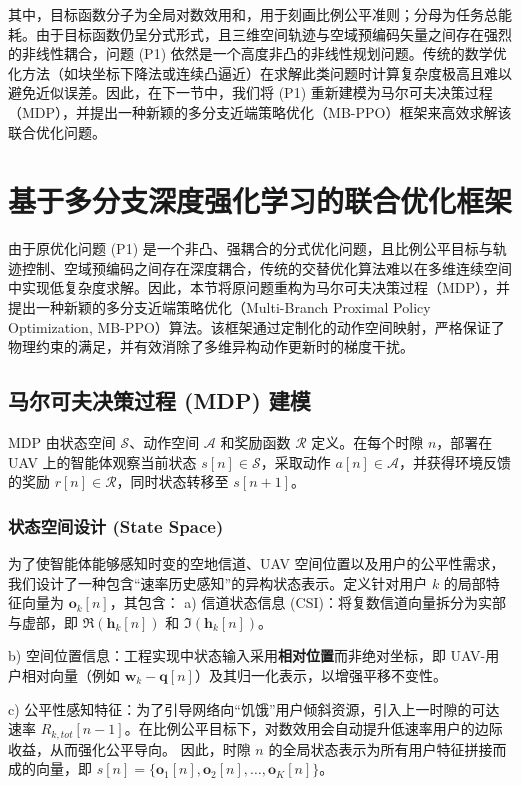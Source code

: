 \documentclass[journal,onecolumn]{IEEEtran}
\begin{document}
	其中，目标函数分子为全局对数效用和，用于刻画比例公平准则；分母为任务总能耗。由于目标函数仍呈分式形式，且三维空间轨迹与空域预编码矢量之间存在强烈的非线性耦合，问题 (P1) 依然是一个高度非凸的非线性规划问题。传统的数学优化方法（如块坐标下降法或连续凸逼近）在求解此类问题时计算复杂度极高且难以避免近似误差。因此，在下一节中，我们将 (P1) 重新建模为马尔可夫决策过程（MDP），并提出一种新颖的多分支近端策略优化（MB-PPO）框架来高效求解该联合优化问题。
	
	
	
	\section{基于多分支深度强化学习的联合优化框架}
	\label{sec:algorithm}
	
	由于原优化问题 (P1) 是一个非凸、强耦合的分式优化问题，且比例公平目标与轨迹控制、空域预编码之间存在深度耦合，传统的交替优化算法难以在多维连续空间中实现低复杂度求解。因此，本节将原问题重构为马尔可夫决策过程（MDP），并提出一种新颖的多分支近端策略优化（Multi-Branch Proximal Policy Optimization, MB-PPO）算法。该框架通过定制化的动作空间映射，严格保证了物理约束的满足，并有效消除了多维异构动作更新时的梯度干扰。
	
	\subsection{马尔可夫决策过程 (MDP) 建模}
	MDP 由状态空间 $\mathcal{S}$、动作空间 $\mathcal{A}$ 和奖励函数 $\mathcal{R}$ 定义。在每个时隙 $n$，部署在 UAV 上的智能体观察当前状态 $s[n] \in \mathcal{S}$，采取动作 $a[n] \in \mathcal{A}$，并获得环境反馈的奖励 $r[n] \in \mathcal{R}$，同时状态转移至 $s[n+1]$。
	
	\subsubsection{状态空间设计 (State Space)}
	为了使智能体能够感知时变的空地信道、UAV 空间位置以及用户的公平性需求，我们设计了一种包含“速率历史感知”的异构状态表示。定义针对用户 $k$ 的局部特征向量为 $\mathbf{o}_k[n]$，其包含：
	a) 信道状态信息 (CSI)：将复数信道向量拆分为实部与虚部，即 $\Re(\mathbf{h}_k[n])$ 和 $\Im(\mathbf{h}_k[n])$。
	
	b) 空间位置信息：工程实现中状态输入采用\textbf{相对位置}而非绝对坐标，即 UAV-用户相对向量（例如 $\mathbf{w}_k-\mathbf{q}[n]$）及其归一化表示，以增强平移不变性。
	
	c) 公平性感知特征：为了引导网络向“饥饿”用户倾斜资源，引入上一时隙的可达速率 $R_{k,tot}[n-1]$。在比例公平目标下，对数效用会自动提升低速率用户的边际收益，从而强化公平导向。
	因此，时隙 $n$ 的全局状态表示为所有用户特征拼接而成的向量，即 $s[n] = \{ \mathbf{o}_1[n], \mathbf{o}_2[n], \dots, \mathbf{o}_K[n] \}$。
	
\end{document}
